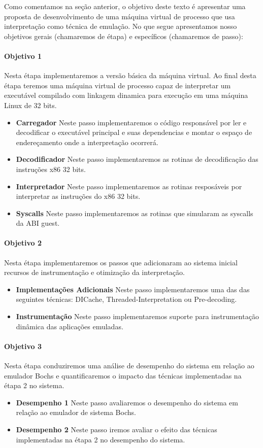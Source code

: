 \documentclass[11pt,twoside]{article}
\begin{document}
Como comentamos na seção anterior, o objetivo deste texto é apresentar
uma proposta de desenvolvimento de uma máquina virtual de processo que
usa interpretação como técnica de emulação. No que segue apresentamos
nosso objetivos gerais (chamaremos de étapa) e específicos (chamaremos
de passo):

\paragraph{Objetivo 1} Nesta étapa implementaremos a versão básica da 
máquina virtual. Ao final desta étapa teremos uma máquina virtual de
processo capaz de interpretar um executável compilado com linkagem
dinamica para execução em uma máquina Linux de 32 bits.
	\begin{itemize}
		\item \textbf{Carregador} Neste passo implementaremos o código responsável
		por ler e decodificar o executável principal e suas dependencias
		e montar o espaço de endereçamento onde a interpretação ocorrerá.
		\item \textbf{Decodificador} Neste passo implementaremos as rotinas de 
		decodificação das instruções x86 32 bits.
		\item \textbf{Interpretador} Neste passo implementaremos as rotinas 
		resposáveis por interpretar as instruções do x86 32 bits.
		\item \textbf{Syscalls} Neste passo implementaremos as rotinas que simularam
		as syscalls da ABI guest.
	\end{itemize}

\paragraph{Objetivo 2} Nesta étapa implementaremos os passos que adicionaram
ao sistema inicial recursos de instrumentação e otimização da interpretação.
	\begin{itemize}
		\item \textbf{Implementações Adicionais} Neste passo implementaremos uma das
		das seguintes técnicas: DICache, Threaded-Interpretation ou Pre-decoding.
		\item \textbf{Instrumentação} Neste passo implementaremos suporte para 
		instrumentação dinâmica das aplicações emuladas.
	\end{itemize}
 
\paragraph{Objetivo 3} Nesta étapa conduziremos uma análise de desempenho do sistema
em relação ao emulador Bochs e quantificaremos o impacto das técnicas implementadas
na étapa 2 no sistema.
	\begin{itemize}
		\item \textbf{Desempenho 1} Neste passo avaliaremos o desempenho do sistema
		em relação ao emulador de sistema Bochs.
		\item \textbf{Desempenho 2} Neste passo iremos avaliar o efeito das técnicas 
		implementadas na étapa 2 no desempenho do sistema.
	\end{itemize}
\end{document}
